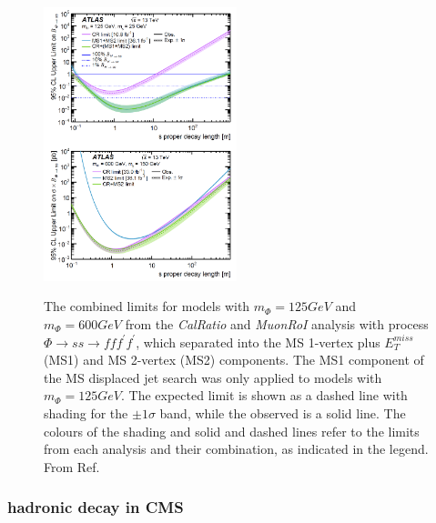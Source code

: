 \begin{figure}[!htbp]
    \centering
    \caption{The combined limits for models with $m_\Phi = 125 GeV$ and $m_\Phi = 600 GeV$ from the \textit{CalRatio} and \textit{MuonRoI} analysis with process $\Phi \rightarrow ss \rightarrow fff^{'}f^{'}$, which separated into the MS 1-vertex plus $E_T^{miss}$ (MS1) and MS 2-vertex (MS2) components. The MS1 component of the MS displaced jet search was only applied to models with $m_\Phi = 125 GeV$. The expected limit is shown as a dashed line with shading for the $\pm 1\sigma$ band, while the observed is a solid line. The colours of the shading and solid and dashed lines refer to the limits from each analysis and their combination, as indicated in the legend. From Ref.\cite{Aaboud:2019opc} }
    \includegraphics[width=0.5\textwidth]{fig/NeutralLLPinATLAScal.png}
    \label{fig:NeutralLLPinATLAScalSummary}
\end{figure}

\subsubsection{hadronic decay in CMS}

